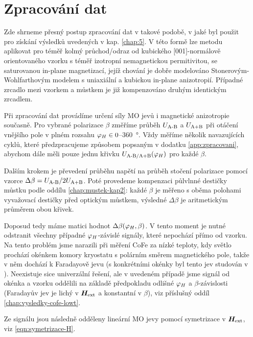 \section{Zpracování dat}
\label{chap:zpracovani-dat}

Zde shrneme přesný postup zpracování dat v takové podobě, v jaké byl použit pro získání výsledků uvedených v kap. \ref{chap:5}.
V této formě lze metodu aplikovat pro téměř kolmý průchod/odraz od kubického [001]-normálově orientovaného vzorku s téměř izotropní nemagnetickou permitivitou, se saturovanou in-plane magnetizací, jejíž chování je dobře modelováno Stonerovým-Wohlfarthovým modelem s uniaxiální a kubickou in-plane anizotropií.
Případné zrcadlo mezi vzorkem a můstkem je již kompenzováno druhým identickým zrcadlem.

Při zpracování dat provádíme určení síly MO jevů i magnetické anizotropie současně.
Pro vybrané polarizace $\beta$ změříme průběh $U_\textrm{A-B}$ a $U_\textrm{A+B}$ při otáčení vnějšího pole v plném rozsahu $\varphi_H \in 0$--\SI{360}{\degree}.
Vždy měříme několik navazujících cyklů, které předzpracujeme způsobem popsaným v dodatku \ref{app:zpracovani}, abychom dále měli pouze jednu křivku $U_\textrm{A-B/A+B}(\varphi_H)$ pro každé $\beta$.

Dalším krokem je převedení průběhu napětí na průběh stočení polarizace pomocí vzorce $\Delta\beta=U_\textrm{A-B}/2U_\textrm{A+B}$.
Poté provedeme kompenzaci půlvlnné destičky můstku podle oddílu \ref{chap:mustek-kap2}: každé $\beta$ je měřeno s oběma polohami vyvažovací destičky před optickým můstkem, výsledné $\Delta\beta$ je aritmetickým průměrem obou křivek.

Doposud tedy máme matici hodnot $\Delta\beta(\varphi_H, \beta)$.
V tento moment je nutné odstranit všechny případné $\varphi_H$-závislé signály, které nepochází přímo od vzorku.
Na tento problém jsme narazili při měření CoFe za nízké teploty, kdy světlo prochází okénkem komory kryostatu s polárním směrem magnetického pole, takže v něm dochází k Faradayově jevu (s konkrétními okénky byl tento jev studován v \cite{baduraMagnetooptickaMereniPro2019}).
Neexistuje sice univerzální řešení, ale v uvedeném případě jsme signál od okénka a vzorku oddělili na základě předpokladu odlišné $\varphi_H$ a $\beta$-závislosti (Faradayův jev je lichý v $\bm{H}_\textrm{ext}$ a konstantní v $\beta$), viz příslušný oddíl \ref{chap:vysledky-cofe-lowt}.

Ze signálu jsou následně odděleny lineární MO jevy pomocí symetrizace v $\bm{H}_\textrm{ext}$, viz \eqref{eqn:symetrizace-H}.

